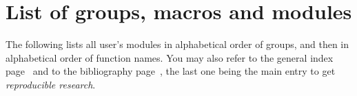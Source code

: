 %
%


\part{List of groups, macros and modules}
\label{part_list}

The following lists all user's modules in alphabetical order of groups, 
and then in alphabetical order of function names.
You may also refer to the general index page~\pageref{print_index} and
to the bibliography page~\pageref{bibliography}, the last one being the 
main entry to get {\em reproducible research}.


